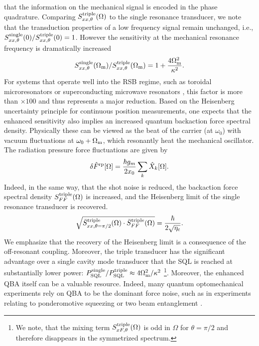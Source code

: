 \documentclass[twocolumn,english,aps,prl,superscriptaddress,showpacs,preprintnumbers]{revtex4}
\begin{document}
that the information on the mechanical signal is encoded in the phase
quadrature. Comparing $S_{xx,\theta}^{\rm{triple}}(\Omega)$ to the single
resonance transducer, we note that the transduction properties of a 
low frequency signal remain unchanged, i.e., $S_{xx,\theta}^{\rm{single}}(0)/S_{xx,\theta}^{\rm{triple}}(0)=1$.
However the sensitivity at the mechanical resonance frequency is dramatically
increased\begin{equation}
S_{xx,\theta}^{\rm{single}}(\Omega_{\rm{m}})/S_{xx,\theta}^{\rm{triple}}(\Omega_{\rm{m}})=1+\frac{4\Omega_{\rm{m}}^{2}}{\kappa^{2}}.\end{equation}
For systems that operate well into the RSB
regime, such as toroidal microresonators \cite{schliesser_resolved-sideband_2008}
or superconducting microwave resonators \cite{teufel_nanomechanical_2009}, 
this factor is more than $\times100$ and thus represents
a major reduction. Based on the Heisenberg uncertainty principle for
continuous position measurements, one expects that the enhanced sensitivity
also implies an increased quantum backaction force spectral density.
Physically these can be viewed as the beat of the carrier (at $\omega_{0}$) with vacuum
fluctuations at $\omega_{0}+\Omega_{\rm{m}}$, which resonantly heat the
mechanical oscillator. The radiation pressure force fluctuations are given by\begin{equation}
\delta\hat{F}^{{\rm rp}}[\Omega]=\frac{\hbar g_{m}}{2x_{0}}\sum_{k}\hat{X}_{k}[\Omega].\label{eq:radPress}\end{equation}
Indeed, in the same way, that the shot noise is reduced, the backaction force
spectral density $S_{FF}^{\rm{triple}}(\Omega)$ is increased, and the
Heisenberg limit of the single resonance transducer is recovered.
\begin{equation}
\sqrt{\bar{S}_{xx,\theta=\pi/2}^{{\rm triple}}(\Omega)\cdot\bar{S}_{FF}^{{\rm triple}}(\Omega)}=\frac{\hbar}{2\sqrt{\eta_{{\rm c}}}}.\label{eq:SQL3RT}\end{equation}
We emphasize that the recovery of the Heisenberg
limit is a consequence of the off-resonant coupling. Moreover, the triple transducer
has the significant advantage over a single cavity mode transducer
that the SQL is reached at substantially lower power: $P_{{\rm SQL}}^{{\rm single}}/P_{{\rm SQL}}^{{\rm triple}}\approx4\Omega_{\rm{m}}^{2}/\kappa^{2}$ 
\footnote{We note, that the mixing term $S_{xF,\theta}^{{\rm triple}}(\Omega)$
is odd in $\Omega$ for $\theta=\pi/2$ and therefore disappears in
the symmetrized spectrum. }. Moreover, the enhanced QBA itself can be a valuable resource. Indeed,
many quantum optomechanical experiments rely on QBA to be the dominant
force noise, such as in experiments relating to ponderomotive squeezing \cite{verlot_probing_2008}
or two beam entanglement \cite{mancini_entangling_2002}.
\end{document}
